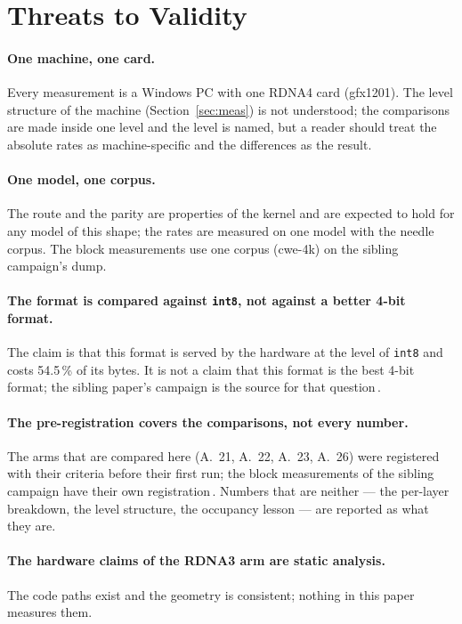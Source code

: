 \documentclass[10pt,twocolumn]{article}
\begin{document}
\section{Threats to Validity}

\paragraph{One machine, one card.} Every measurement is a Windows PC with one RDNA4 card (gfx1201). The
level structure of the machine (Section~\ref{sec:meas}) is not understood; the comparisons are made inside
one level and the level is named, but a reader should treat the absolute rates as machine-specific and the
differences as the result.

\paragraph{One model, one corpus.} The route and the parity are properties of the kernel and are expected
to hold for any model of this shape; the rates are measured on one model with the needle corpus. The block
measurements use one corpus (cwe-4k) on the sibling campaign's dump.

\paragraph{The format is compared against \texttt{int8}, not against a better 4-bit format.} The claim is
that this format is served by the hardware at the level of \texttt{int8} and costs 54.5\,\% of its bytes. It is
not a claim that this format is the best 4-bit format; the sibling paper's campaign is the source for that
question\,\cite{shear}.

\paragraph{The pre-registration covers the comparisons, not every number.} The arms that are compared here
(A.~21, A.~22, A.~23, A.~26) were registered with their criteria before their first run; the block
measurements of the sibling campaign have their own registration\,\cite{shear}. Numbers that are neither
--- the per-layer breakdown, the level structure, the occupancy lesson --- are reported as what they are.

\paragraph{The hardware claims of the RDNA3 arm are static analysis.} The code paths exist and the
geometry is consistent; nothing in this paper measures them.
\end{document}
